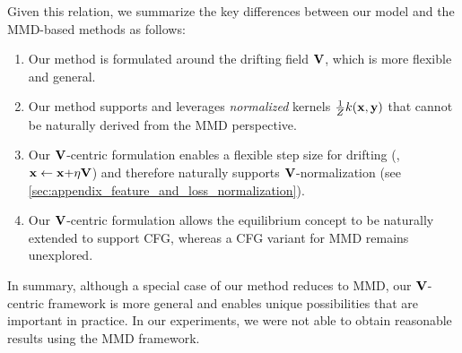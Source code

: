 Given this relation, we summarize the key differences between our model and the MMD-based methods as follows:
\begin{enumerate}
[itemsep=1pt, topsep=1pt, parsep=1pt, partopsep=1pt, label=(\roman*)]
    \item Our method is formulated around the drifting field $\mathbf{V}$, which is more flexible and general.
    \item Our method supports and leverages \textit{normalized} kernels $\frac{1}{Z}k(\mathbf{x}, \mathbf{y})$ that cannot be naturally derived from the MMD perspective.
    \item Our $\mathbf{V}$-centric formulation enables a flexible step size for drifting (\ie, $\mathbf{x} \leftarrow \mathbf{x}{+}\eta\mathbf{V}$) and therefore naturally supports $\mathbf{V}$-normalization (see \ref{sec:appendix_feature_and_loss_normalization}).
    \item Our $\mathbf{V}$-centric formulation allows the equilibrium concept to be naturally extended to support CFG, whereas a CFG variant for MMD remains unexplored.
\end{enumerate}
In summary, although a special case of our method reduces to MMD, our $\mathbf{V}$-centric framework is more general and enables unique possibilities that are important in practice.
In our experiments, we were not able to obtain reasonable results using the MMD framework.

